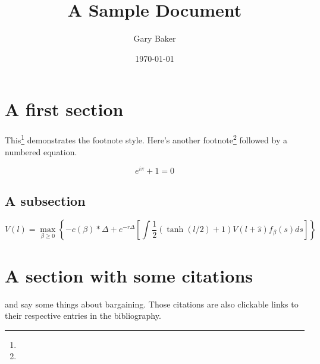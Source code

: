 \documentclass{fancyArticle}
\title{A Sample Document}
\author{Gary Baker}
\date{\today}
\begin{document}
\maketitle

\begin{abstract}
  \lipsum[1]
\end{abstract}

\section{A first section}

This\footnote{\lipsum[1][3]} demonstrates the footnote
style. \lipsum[4] Here's another footnote\footnote{\lipsum[30][1]}
followed by a numbered equation.

\begin{equation}
  \label{eq:1}
  e^{i\pi}+1 = 0
\end{equation}

\lipsum[5]

\subsection{A subsection}

\lipsum[6]

\begin{equation*} 
  V(l) = \max_{\beta\geq 0}\left\{ -c(\beta) * \Delta + e^{-r\Delta}
    \left[ \int \frac{1}{2} (\tanh(l/2)+1) V(l+\hat{s}) f_\beta(s) ds \right]\right\}
\end{equation*}

\lipsum[7]

\section{A section with some citations}

\cite{Nash1950} and \cite{Rubinstein1982} say some things about
bargaining. Those citations are also clickable links to their
respective entries in the bibliography.

\lipsum [20-21]

\pagebreak

\end{document}
